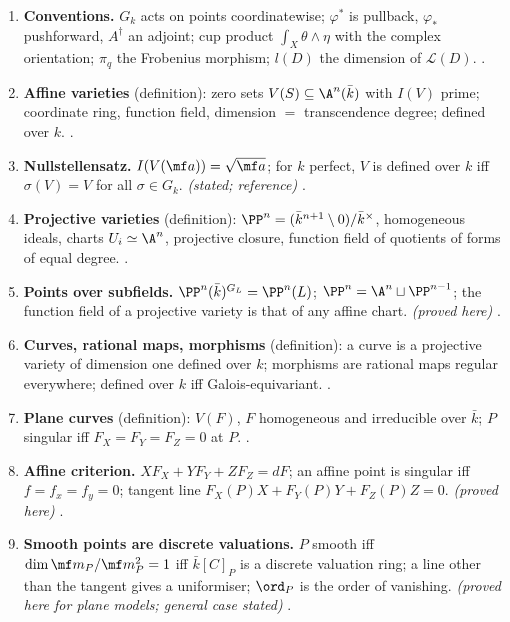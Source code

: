 \begin{enumerate}[label=\textbf{\thechapter.\arabic*}]
\item \textbf{Conventions.} $G_k$ acts on points coordinatewise; $\varphi^*$ is pullback, $\varphi_*$ pushforward, $A^\dagger$ an adjoint; cup product $\int_X\theta\wedge\eta$ with the complex
orientation; $\pi_q$ the Frobenius morphism; $l(D)$ the dimension of $\mathcal L(D)$. .
\item \textbf{Affine varieties} (definition): zero sets $V(S)\subseteq\A^n(\bar k)$ with $I(V)$ prime; coordinate ring, function field, dimension $=$ transcendence degree; defined over $k$.
.
\item \textbf{Nullstellensatz.} $I(V(\mf a))=\sqrt{\mf a}$; for $k$ perfect, $V$ is defined over $k$ iff $\sigma(V)=V$ for all $\sigma\in G_k$. \emph{(stated; reference)}
.
\item \textbf{Projective varieties} (definition): $\PP^n=(\bar k^{n+1}\setminus0)/\bar k^\times$, homogeneous ideals, charts $U_i\simeq\A^n$, projective closure, function field of quotients of forms
of equal degree. .
\item \textbf{Points over subfields.} $\PP^n(\bar k)^{G_L}=\PP^n(L)$; $\PP^n=\A^n\sqcup\PP^{n-1}$; the function field of a projective variety is that of any affine chart. \emph{(proved
here)} .
\item \textbf{Curves, rational maps, morphisms} (definition): a curve is a projective variety of dimension one defined over $k$; morphisms are rational maps regular everywhere; defined
over $k$ iff Galois-equivariant. .
\item \textbf{Plane curves} (definition): $V(F)$, $F$ homogeneous and irreducible over $\bar k$; $P$ singular iff $F_X=F_Y=F_Z=0$ at $P$. .
\item \textbf{Affine criterion.} $XF_X+YF_Y+ZF_Z=dF$; an affine point is singular iff $f=f_x=f_y=0$; tangent line $F_X(P)X+F_Y(P)Y+F_Z(P)Z=0$. \emph{(proved here)}
.
\item \textbf{Smooth points are discrete valuations.} $P$ smooth iff $\dim\mf m_P/\mf m_P^2=1$ iff $\bar k[C]_P$ is a discrete valuation ring; a line other than the tangent gives a uniformiser;
$\ord_P$ is the order of vanishing. \emph{(proved here for plane models; general case stated)} .

\end{enumerate}
